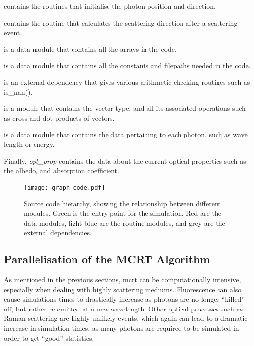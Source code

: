  contains the routines that initialise the photon position and direction.

 contains the routine that calculates the scattering direction after a scattering event.

 is a data module that contains all the arrays in the code.

 is a data module that contains all the constants and filepaths needed in the code.

 is an external dependency that gives various arithmetic checking routines such as is_nan().

 is a module that contains the vector type, and all its associated operations such as cross and dot products of vectors.

 is a data module that contains the data pertaining to each photon, such as wave length or energy.

\noindent Finally, {\color{red} \textit{opt_prop}} contains the data about the current optical properties such as the albedo, and absorption coefficient.


\begin{figure}[!ht]
	\centering
	\texttt{[image: graph-code.pdf]}
	\caption{Source code hierarchy, showing the relationship between different modules. Green is the entry point for the simulation. Red are the data modules, light blue are the routine modules, and grey are the external dependencies.}
	\label{fig:codegraph}
\end{figure}



\subsection*{Parallelisation of the MCRT Algorithm}\label{sec:parasec}

As mentioned in the previous sections, \gls*{mcrt} can be computationally intensive, especially when dealing with highly scattering mediums. Fluorescence can also cause simulations times to drastically increase as photons are no longer ``killed'' off, but rather re-emitted at a new wavelength. Other optical processes such as Raman scattering are highly unlikely events, which again can lead to a dramatic increase in simulation times, as many photons are required to be simulated in order to get ``good'' statistics.

